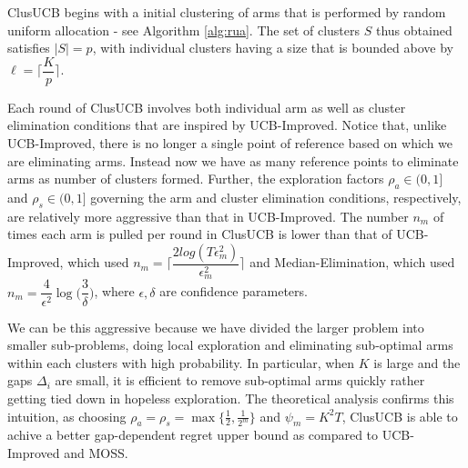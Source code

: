 ClusUCB begins with a initial clustering of arms that is performed by random uniform allocation - see Algorithm \ref{alg:rua}. The set of clusters $S$ thus obtained satisfies $|S|=p$, with individual clusters having a size that is bounded above by $\ell=\bigg\lceil \dfrac{K}{p} \bigg\rceil$.

Each round of ClusUCB involves both individual arm as well as cluster elimination conditions that are inspired by UCB-Improved. Notice that, unlike UCB-Improved, there is no longer a single point of reference based on which we are eliminating arms. Instead now we have as many reference points to eliminate arms as number of clusters formed. 
Further, the exploration factors $\rho_{a}\in (0,1]$ and $\rho_{s}\in (0,1]$ governing the arm and cluster elimination conditions, respectively, are relatively more aggressive than that in UCB-Improved. The number $n_m$ of times each arm is pulled per round in ClusUCB is lower than that of UCB-Improved, which used $n_{m}=\bigg\lceil \dfrac{2log(T\epsilon_{m}^{2})}{\epsilon_{m}^{2}} \bigg\rceil$ and Median-Elimination, which used $n_m=\dfrac{4}{\epsilon^{2}}\log\big(\dfrac{3}{\delta}\big)$, where $\epsilon,\delta$ are confidence parameters.

We can be this aggressive because we have divided the larger problem into smaller sub-problems, doing local exploration and eliminating sub-optimal arms within each clusters with high probability. In particular, when $K$ is large and the gaps $\Delta_i$ are small, it is efficient to remove sub-optimal arms quickly rather getting tied down in hopeless exploration. 
The theoretical analysis confirms this intuition, as choosing $\rho_a=\rho_s = \max\lbrace \frac{1}{2},\frac{1}{2^m}\rbrace$ and $\psi_m=K^2T$, ClusUCB is able to achive a better gap-dependent regret upper bound as compared to UCB-Improved and MOSS. 

